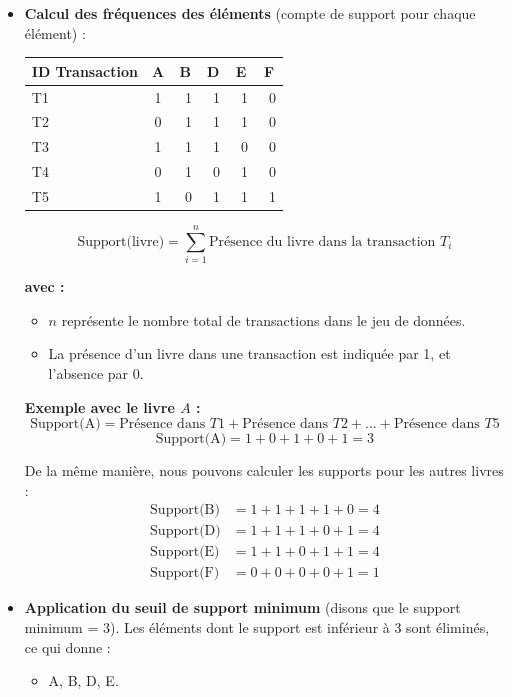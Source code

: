 \documentclass[a4paper, 12pt]{article}
\begin{document}
\begin{itemize}
    \item \textbf{Calcul des fréquences des éléments} (compte de support pour chaque élément) :
    
    \begin{longtable}{|l|c|c|c|c|c|}
    \hline
    \textbf{ID Transaction} & \textbf{A} & \textbf{B} & \textbf{D} & \textbf{E} & \textbf{F} \\
    \hline
    \endfirsthead
    \hline
    T1 & 1 & \ 1 & \ 1 & \ 1 & \ 0 \\
    \hline
    T2 & 0 & \ 1 & \ 1 & \ 1 & \ 0 \\
    \hline
    T3 & 1 & \ 1 & \ 1 & \ 0 & \ 0 \\
    \hline
    T4 & 0 & \ 1 & \ 0 & \ 1 & \ 0 \\
    \hline
    T5 & 1 & \ 0 & \ 1 & \ 1 & \ 1 \\
    \hline
    \end{longtable}
    
    \[
    \text{Support(livre)} = \sum_{i=1}^{n} \text{Présence du livre dans la transaction } T_i
    \]

    \textbf{avec :}
    \begin{itemize}
        \item \(n\) représente le nombre total de transactions dans le jeu de données.
        \item La présence d'un livre dans une transaction est indiquée par 1, et l'absence par 0.
    \end{itemize}

    \textbf{Exemple avec le livre \(A\) :}
    \[
    \text{Support(A)} = \text{Présence dans } T1 + \text{Présence dans } T2 + \text{...} + \text{Présence dans } T5
    \]
    \[
    \text{Support(A)} = 1 + 0 + 1 + 0 + 1 = 3
    \]

    De la même manière, nous pouvons calculer les supports pour les autres livres :
    \begin{align*}
    \text{Support(B)} & = 1 + 1 + 1 + 1 + 0 = 4 \\
    \text{Support(D)} & = 1 + 1 + 1 + 0 + 1 = 4 \\
    \text{Support(E)} & = 1 + 1 + 0 + 1 + 1 = 4 \\
    \text{Support(F)} & = 0 + 0 + 0 + 0 + 1 = 1
    \end{align*}

    \item \textbf{Application du seuil de support minimum} (disons que le support minimum = 3). Les éléments dont le support est inférieur à 3 sont éliminés, ce qui donne :
    \begin{itemize}
        \item A, B, D, E.
    \end{itemize}
    

\end{itemize}
\end{document}
